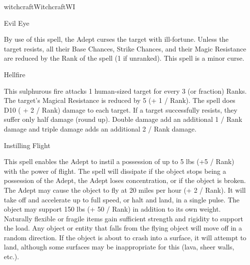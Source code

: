 \begin{college}[1.1]{witchcraft}{Witchcraft}{WI}
\begin{spell}[S-12]{Evil Eye}

\begin{effects}
By use of this spell, the Adept curses the target with ill-fortune.
Unless the target resists, all their Base Chances, Strike Chances, and
their Magic Resistance are reduced by the Rank of the spell (1 if
unranked).  This spell is a minor curse.
\end{effects}
\end{spell}

\begin{spell}[S-13]{Hellfire}

\begin{effects}
This sulphurous fire attacks 1 human-sized target for every 3 (or
fraction) Ranks. The target's Magical Resistance is reduced by 5 (+ 1
/ Rank). The spell does D10 ( + 2 / Rank) damage to each target. If a
target successfully resists, they suffer only half damage (round up).
Double damage add an additional 1 / Rank damage and triple damage adds
an additional 2 / Rank damage.
\end{effects}
\end{spell}

\begin{spell}[S-14]{Instilling Flight}

\begin{effects}
This spell enables the Adept to instil a possession of up to 5 lbs (+5
/ Rank) with the power of flight. The spell will dissipate if the
object stops being a possession of the Adept, the Adept loses
concentration, or if the object is broken. The Adept may cause the
object to fly at 20 miles per hour (+ 2 / Rank). It will take off and
accelerate up to full speed, or halt and land, in a single pulse. The
object may support 150 lbs (+ 50 / Rank) in addition to its own
weight. Naturally flexible or fragile items gain sufficient strength
and rigidity to support the load. Any object or entity that falls from
the flying object will move off in a random direction. If the object
is about to crash into a surface, it will attempt to land, although
some surfaces may be inappropriate for this (lava, sheer walls, etc.).
\end{effects}
\end{spell}


\end{college}
